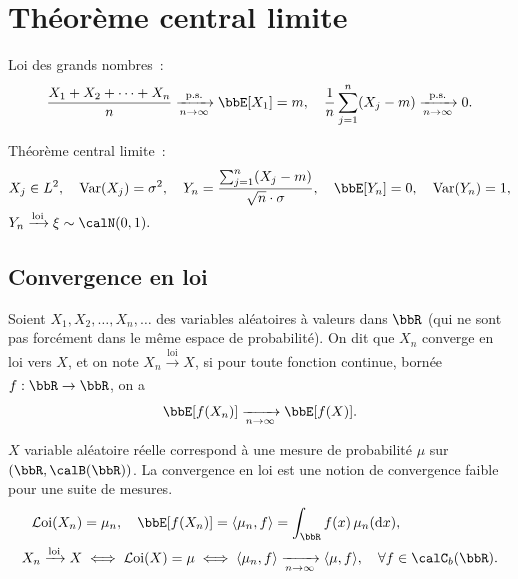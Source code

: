 \chapter{Théorème central limite}

Loi des grands nombres~:
\[ \frac{X_1 + X_2 + \cdots + X_n}{n} \xrightarrow[n \to \infty]{\text{p.s.}} \bbE[X_1] = m, \quad
    \frac{1}{n} \sum_{j = 1}^n (X_j - m) \xrightarrow[n \to \infty]{\text{p.s.}} 0. \]

Théorème central limite~:
\begin{align*}
     & X_j \in L^2, \quad \var(X_j) = \sigma^2, \quad Y_n = \frac{\sum_{j = 1}^n (X_j - m)}{\sqrt{n} \cdot \sigma}, \quad
    \bbE[Y_n] = 0, \quad \var(Y_n) = 1,                                                                                   \\
     & Y_n \xrightarrow[]{\text{loi}} \xi \sim \calN(0,1).
\end{align*}

\section{Convergence en loi}

\begin{deff}
    Soient $X_1, X_2, \ldots, X_n, \ldots$ des variables aléatoires à valeurs dans $\bbR$
    (qui ne sont pas forcément dans le même espace de probabilité).
    On dit que $X_n$ converge en loi vers $X$, et on note $X_n \xrightarrow[]{\text{loi}} X$,
    si pour toute fonction continue, bornée $f: \bbR \to \bbR$,
    on a
    \[ \bbE[f(X_n)] \xrightarrow[n \to \infty]{} \bbE[f(X)]. \]
\end{deff}

\begin{rqq}
    $X$ variable aléatoire réelle correspond à une mesure de probabilité $\mu$ sur $(\bbR, \calB(\bbR))$.
    La convergence en loi est une notion de convergence faible pour une suite de mesures.
    \begin{align*}
        \loi(X_n) & = \mu_n, \quad \bbE[f(X_n)] = \langle \mu_n, f \rangle = \int_{\bbR} f(x) \, \mu_n(\dif x),                                              \\
        X_n \xrightarrow[]{\text{loi}} X
                  & \iff \loi(X) = \mu \iff \langle \mu_n, f \rangle \xrightarrow[n \to \infty]{} \langle \mu, f \rangle, \quad \forall f \in \calC_b(\bbR).
    \end{align*}
\end{rqq}

